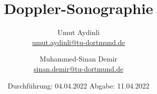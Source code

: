 

\subject{US}
\title{Doppler-Sonographie}
\author{Umut Aydinli \\
 \href{mailto:umut.aydinli@tu-dortmund.de}{umut.aydinli@tu-dortmund.de}
 \and Muhammed-Sinan Demir \\
 \href{mailto:sinan.demir@tu-dortmund.de}{sinan.demir@tu-dortmund.de}
 }
\date{
  Durchführung: 04.04.2022
  \hspace{3em}
  Abgabe: 11.04.2022
}




\maketitle
\tableofcontents
\newpage








\nocite{*}
\printbibliography{}

